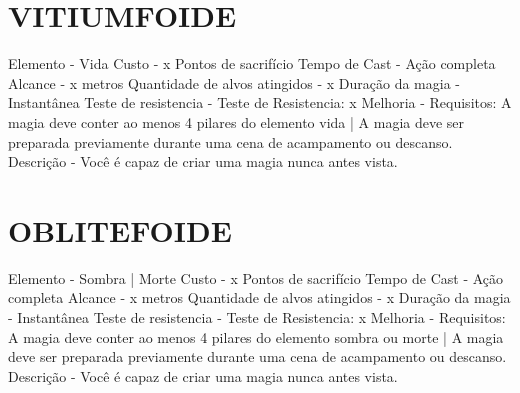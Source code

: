 \documentclass{article}%
\begin{document}
%
\section{VITIUMFOIDE}%
\label{sec:VITIUMFOIDE}%
Elemento {-}  Vida\newline%
Custo {-}  x Pontos de sacrifício\newline%
Tempo de Cast {-}  Ação completa\newline%
Alcance {-}  x metros\newline%
Quantidade de alvos atingidos {-}  x\newline%
Duração da magia {-}  Instantânea\newline%
Teste de resistencia {-} Teste de Resistencia: x\newline%
Melhoria {-} Requisitos: A magia deve conter ao menos 4 pilares do elemento vida | A magia deve ser preparada previamente durante uma cena de acampamento ou descanso.\newline%
Descrição {-}  Você é capaz de criar uma magia nunca antes vista.\newline%

%
\section{OBLITEFOIDE}%
\label{sec:OBLITEFOIDE}%
Elemento {-}  Sombra | Morte\newline%
Custo {-}  x Pontos de sacrifício\newline%
Tempo de Cast {-}  Ação completa\newline%
Alcance {-}  x metros\newline%
Quantidade de alvos atingidos {-}  x\newline%
Duração da magia {-}  Instantânea\newline%
Teste de resistencia {-} Teste de Resistencia: x\newline%
Melhoria {-} Requisitos: A magia deve conter ao menos 4 pilares do elemento sombra ou morte | A magia deve ser preparada previamente durante uma cena de acampamento ou descanso.\newline%
Descrição {-}  Você é capaz de criar uma magia nunca antes vista.\newline%

%
\end{document}
